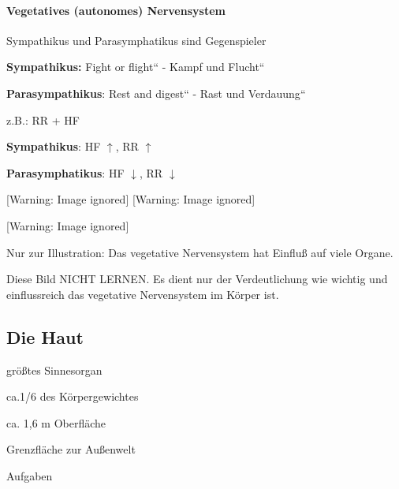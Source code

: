 \documentclass{article}
\begin{document}
\paragraph[Vegetatives (autonomes) \ Nervensystem]{Vegetatives
(autonomes)  Nervensystem}
{\mdseries\color{black}
Sympathikus  und Parasymphatikus  sind  Gegenspieler}

{\mdseries
\textbf{Sympathikus: {\quotedblbase}}Fight or flight{\textquotedblleft}
- {\quotedblbase}Kampf und Flucht{\textquotedblleft}}

{\mdseries
\textbf{Parasympathikus}: {\quotedblbase}Rest and
digest{\textquotedblleft} - {\quotedblbase}Rast und
Verdauung{\textquotedblleft}}

{\mdseries
z.B.: RR + HF}

{\mdseries
\textbf{Sympathikus}:  HF ${\uparrow}$, RR ${\uparrow}$}

{\mdseries
\textbf{Parasymphatikus}: HF ${\downarrow}$, RR ${\downarrow}$}

  [Warning: Image ignored] %
   [Warning: Image ignored] %
 

  [Warning: Image ignored] %
 

{\mdseries\upshape
Nur zur Illustration: Das vegetative Nervensystem hat Einflu{\ss} auf
viele Organe.}

{\mdseries\upshape
Diese Bild NICHT LERNEN. Es dient nur der Verdeutlichung wie wichtig und
einflussreich das vegetative Nervensystem im K\"orper ist. }

\subsection{Die Haut}
{\mdseries
gr\"o{\ss}tes Sinnesorgan}

{\mdseries
ca.1/6 des K\"orpergewichtes}

{\mdseries
ca. 1,6 m{\texttwosuperior} Oberfl\"ache}

{\mdseries
Grenzfl\"ache zur Au{\ss}enwelt}

{\mdseries
Aufgaben}
\end{document}
